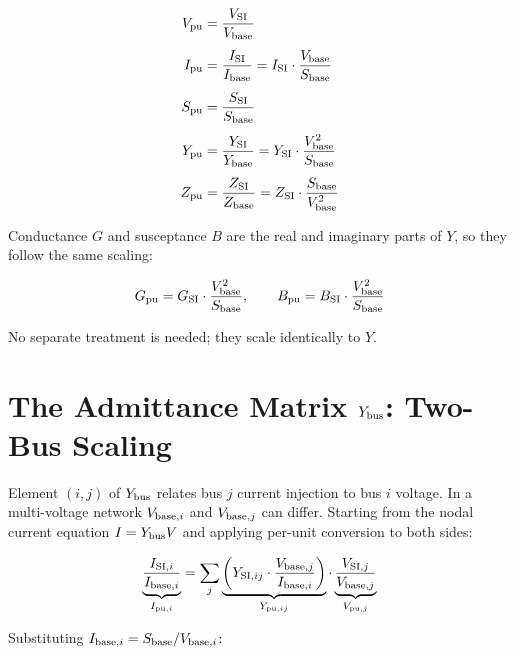 \documentclass{article}
\begin{document}
\begin{align}
  V_{\rm pu} &= \frac{V_{\rm SI}}{V_{\rm base}}
  \label{eq:vpu}\\[4pt]
  I_{\rm pu} &= \frac{I_{\rm SI}}{I_{\rm base}}
             = I_{\rm SI} \cdot \frac{V_{\rm base}}{S_{\rm base}}
  \label{eq:ipu}\\[4pt]
  S_{\rm pu} &= \frac{S_{\rm SI}}{S_{\rm base}}
  \label{eq:spu}\\[4pt]
  Y_{\rm pu} &= \frac{Y_{\rm SI}}{Y_{\rm base}}
             = Y_{\rm SI} \cdot \frac{V_{\rm base}^2}{S_{\rm base}}
  \label{eq:ypu}\\[4pt]
  Z_{\rm pu} &= \frac{Z_{\rm SI}}{Z_{\rm base}}
             = Z_{\rm SI} \cdot \frac{S_{\rm base}}{V_{\rm base}^2}
  \label{eq:zpu}
\end{align}

Conductance $G$ and susceptance $B$ are the real and imaginary parts of $Y$,
so they follow the same scaling:

\begin{equation}
  G_{\rm pu} = G_{\rm SI} \cdot \frac{V_{\rm base}^2}{S_{\rm base}},
  \qquad
  B_{\rm pu} = B_{\rm SI} \cdot \frac{V_{\rm base}^2}{S_{\rm base}}
\end{equation}

No separate treatment is needed; they scale identically to $Y$.

\section{The Admittance Matrix $Y_{\rm bus}$: Two-Bus Scaling}

Element $(i,j)$ of $Y_{\rm bus}$ relates bus $j$ current injection to bus
$i$ voltage.  In a multi-voltage network $V_{{\rm base},i}$ and
$V_{{\rm base},j}$ can differ.  Starting from the nodal current equation
$I = Y_{\rm bus} V$ and applying per-unit conversion to both sides:

\begin{equation}
  \underbrace{\frac{I_{{\rm SI},i}}{I_{{\rm base},i}}}_{I_{{\rm pu},i}}
  =
  \sum_j
  \underbrace{\left(
    Y_{{\rm SI},ij} \cdot \frac{V_{{\rm base},j}}{I_{{\rm base},i}}
  \right)}_{Y_{{\rm pu},ij}}
  \cdot
  \underbrace{\frac{V_{{\rm SI},j}}{V_{{\rm base},j}}}_{V_{{\rm pu},j}}
\end{equation}

Substituting $I_{{\rm base},i} = S_{\rm base}/V_{{\rm base},i}$:
\end{document}
